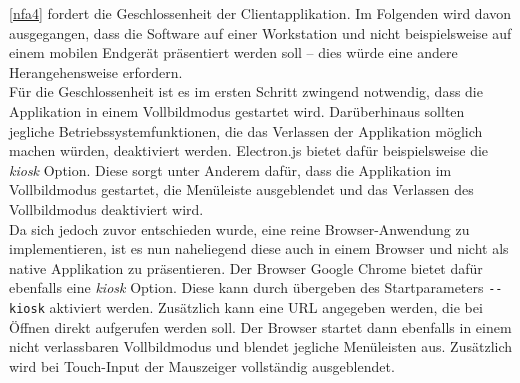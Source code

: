 \ref{nfa4} fordert die Geschlossenheit der Clientapplikation. Im Folgenden wird davon ausgegangen, 
dass die Software auf einer Workstation und nicht beispielsweise auf einem mobilen Endgerät präsentiert
werden soll -- dies würde eine andere Herangehensweise erfordern.\\
Für die Geschlossenheit ist es im ersten Schritt zwingend notwendig, dass die Applikation in einem 
Vollbildmodus gestartet wird. Darüberhinaus sollten jegliche Betriebssystemfunktionen, die das 
Verlassen der Applikation möglich machen würden, deaktiviert werden. Electron.js bietet dafür beispielsweise
die \emph{kiosk} Option. Diese sorgt unter Anderem dafür, dass die Applikation im Vollbildmodus gestartet, 
die Menüleiste ausgeblendet und das Verlassen des Vollbildmodus deaktiviert wird.\\
Da sich jedoch zuvor entschieden wurde, eine reine Browser-Anwendung zu implementieren, ist es nun naheliegend 
diese auch in einem Browser und nicht als native Applikation zu präsentieren. Der Browser Google Chrome bietet
dafür ebenfalls eine \emph{kiosk} Option. Diese kann durch übergeben des Startparameters \texttt{-{}-kiosk}
aktiviert werden. Zusätzlich kann eine URL angegeben werden, die bei Öffnen direkt aufgerufen werden soll.
Der Browser startet dann ebenfalls in einem nicht verlassbaren Vollbildmodus und blendet jegliche Menüleisten aus.
Zusätzlich wird bei Touch-Input der Mauszeiger vollständig ausgeblendet.
